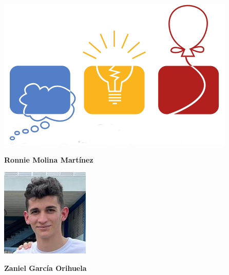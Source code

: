 \begin{minipage}{0.2\textwidth}
	\includegraphics[width=\linewidth]{img/icpc.png} %
\end{minipage}
\hfill
\begin{minipage}{0.7\textwidth}
	\textbf{Ronnie Molina Martínez}
	
\end{minipage}

\begin{minipage}{0.2\textwidth}
	\includegraphics[width=\linewidth]{img/concursantes/zaniel.png} %
\end{minipage}
\hfill
\begin{minipage}{0.7\textwidth}
	\textbf{Zaniel García Orihuela}
	
\end{minipage}

